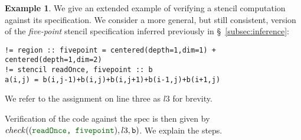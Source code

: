 \documentclass[10pt,preprint]{sigplanconf}
\newcounter{block}
\theoremstyle{definition}
\newtheorem{example}[block]{Example}
\newcommand{\interp}[1]{\llbracket{#1}\rrbracket}
\newcommand{\vtwo}[2]{\setlength{\arraycolsep}{0em}
\left[\begin{array}{l}#1\\#2\end{array}\right]}
\newcommand{\consAName}{\textbf{agree}}
\newcommand{\consSub}[3]{#2 \,\, \consAName{}_{#1} \,\,#3}
\begin{document}
\begin{example}
  We give an extended example of verifying a stencil computation
  against its specification. We consider a more general, but still
  consistent, version of the \textit{five-point} stencil specification
  inferred previously in \S~\ref{subsec:inference}:
%
\begin{verbatim}
!= region :: fivepoint = centered(depth=1,dim=1) + centered(depth=1,dim=2)
!= stencil readOnce, fivepoint :: b
a(i,j) = b(i,j-1)+b(i,j)+b(i,j+1)+b(i-1,j)+b(i+1,j)
\end{verbatim}
%
We refer to the assignment on line three as $l3$ for brevity.

Verification of the code against the spec is then given by
$check(({\textcolor{darkgreen}{\texttt{readOnce, fivepoint}}}),l3,\texttt{b})$.
We explain the steps.
\end{example}
\end{document}
